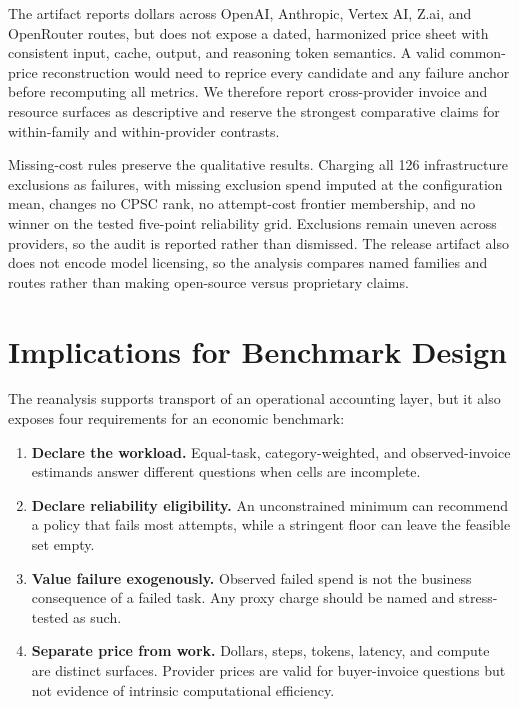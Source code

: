\documentclass[11pt]{article}
\begin{document}
The artifact reports dollars across OpenAI, Anthropic, Vertex AI, Z.ai, and OpenRouter routes, but
does not expose a dated, harmonized price sheet with consistent input, cache, output, and reasoning
token semantics. A valid common-price reconstruction would need to reprice every candidate and any
failure anchor before recomputing all metrics. We therefore report cross-provider invoice and
resource surfaces as descriptive and reserve the strongest comparative claims for within-family
and within-provider contrasts.

Missing-cost rules preserve the qualitative results. Charging all 126 infrastructure exclusions as
failures, with missing exclusion spend imputed at the configuration mean, changes no CPSC rank, no
attempt-cost frontier membership, and no winner on the tested five-point reliability grid.
Exclusions remain uneven across providers, so the audit is reported rather than dismissed. The
release artifact also does not encode model licensing, so the analysis compares named families and
routes rather than making open-source versus proprietary claims.

\section{Implications for Benchmark Design}

The reanalysis supports transport of an operational accounting layer, but it also exposes four
requirements for an economic benchmark:
\begin{enumerate}
  \item \textbf{Declare the workload.} Equal-task, category-weighted, and observed-invoice
        estimands answer different questions when cells are incomplete.
  \item \textbf{Declare reliability eligibility.} An unconstrained minimum can recommend a policy
        that fails most attempts, while a stringent floor can leave the feasible set empty.
  \item \textbf{Value failure exogenously.} Observed failed spend is not the business consequence
        of a failed task. Any proxy charge should be named and stress-tested as such.
  \item \textbf{Separate price from work.} Dollars, steps, tokens, latency, and compute are
        distinct surfaces. Provider prices are valid for buyer-invoice questions but not evidence
        of intrinsic computational efficiency.
\end{enumerate}
\end{document}
